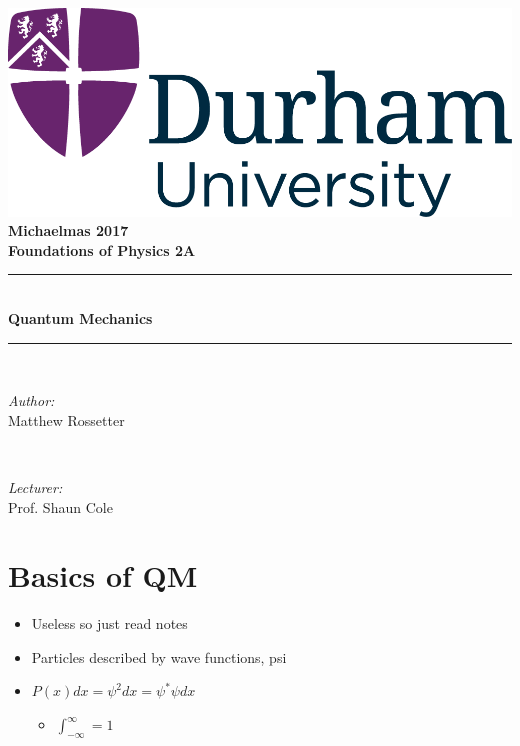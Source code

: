 \documentclass[a4paper,11pt,normalem]{article}
\newcommand{\HRule}{\rule{\linewidth}{0.5mm}}
\begin{document}
{\centering
{\includegraphics[scale=0.5]{../../logo0.png}\hfill{\Large\bfseries Michaelmas 2017}}\\[1.5cm]
{\LARGE\bfseries Foundations of Physics 2A}\\[0.5cm]
\HRule \\[0.3cm]
{\huge\bfseries Quantum Mechanics}\\[0.1cm]
\HRule \\[1cm]}
\begin{center}
\begin{minipage}{0.4\textwidth}
    \begin{flushleft} \large
        \emph{Author:} \\ Matthew Rossetter
    \end{flushleft}
\end{minipage}~
\begin{minipage}{0.4\textwidth}
    \begin{flushright} \large
        \emph{Lecturer:} \\ Prof. Shaun Cole
    \end{flushright}
\end{minipage}
\end{center}
\section{Basics of QM}\label{basics-of-qm}

\begin{itemize}
\item
  Useless so just read notes
\item
  Particles described by wave functions, psi
\item
  \(P(x) dx = \psi^2 dx = \psi^* \psi dx\)
  \begin{itemize}
  \item
    \(\int_{-\infty}^{\infty} = 1\)
  \end{itemize}
\end{itemize}
\end{document}
